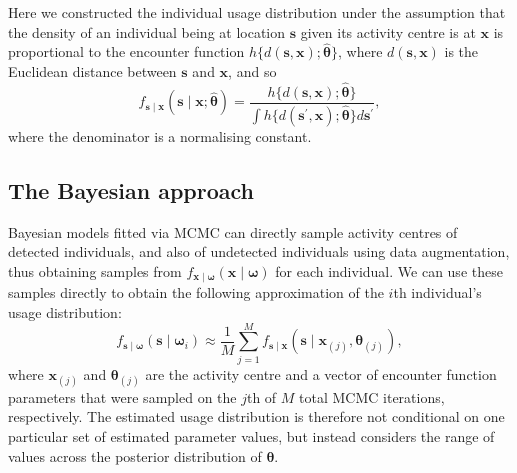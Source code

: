 \documentclass[10pt,a4paper]{article}\usepackage[]{graphicx}\usepackage[]{color}
\begin{document}
 Here we constructed
the individual usage distribution under the assumption that the
density of an individual being at location $\bm{s}$ given its activity
centre is at $\bm{x}$ is proportional to the encounter function
$h\{d(\bm{s}, \bm{x}); \widehat{\bm{\theta}}\}$, where $d(\bm{s},
\bm{x})$ is the Euclidean distance between $\bm{s}$ and $\bm{x}$, and
so
\begin{equation}
  f_{\bm{s} \mid \bm{x}}(\bm{s} \mid \bm{x}; \widehat{\bm{\theta}}) = \frac{h\{d(\bm{s}, \bm{x}); \widehat{\bm{\theta}}\}}{\int h\{d(\bm{s}^\prime, \bm{x}); \widehat{\bm{\theta}}\} d\bm{s}^\prime},
\end{equation}
where the denominator is a normalising constant.
\subsection{The Bayesian approach}

Bayesian models fitted via MCMC can directly sample activity centres
of detected individuals, and also of undetected individuals using data
augmentation, thus obtaining samples from $f_{\bm{x} \mid
  \bm{\omega}}(\bm{x} \mid \bm{\omega})$ for each individual. We can
use these samples directly to obtain the following approximation of
the $i$th individual's usage distribution:
\begin{equation}
  f_{\bm{s} \mid \bm{\omega}}(\bm{s} \mid \bm{\omega}_i) \approx
  \frac{1}{M} \sum_{j = 1}^M f_{\bm{s} \mid \bm{x}}(\bm{s} \mid
  \bm{x}_{(j)}, \bm{\theta}_{(j)}),
\end{equation}
where $\bm{x}_{(j)}$ and $\bm{{\theta}}_{(j)}$ are the activity centre
and a vector of encounter function parameters that were sampled on the
$j$th of $M$ total MCMC iterations, respectively. The
estimated usage distribution is therefore not conditional on one
particular set of estimated parameter values, but instead considers
the range of values across the posterior distribution of
$\bm{\theta}$.
\end{document}
